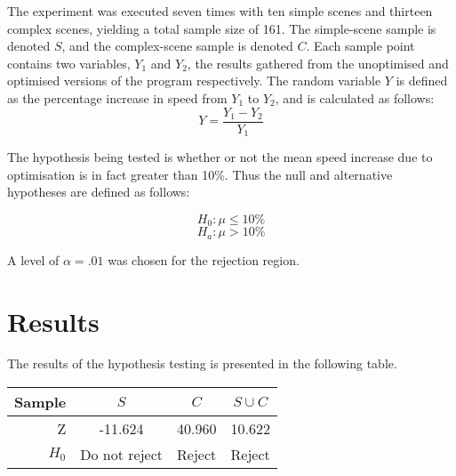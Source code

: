 \documentclass[a4paper]{article}
\begin{document}
The experiment was executed seven times with ten simple scenes and thirteen complex scenes, yielding a total sample size of 161. The simple-scene sample is denoted $S$, and the complex-scene sample is denoted $C$. Each sample point contains two variables, $Y_1$ and $Y_2$, the results gathered from the unoptimised and optimised versions of the program respectively. The random variable $Y$ is defined as the percentage increase in speed from $Y_1$ to $Y_2$, and is calculated as follows:
$$
Y = \frac{Y_1 - Y_2}{Y_1}
$$

\begin{center}
\end{center}

The hypothesis being tested is whether or not the mean speed increase due to optimisation is in fact greater than 10\%. Thus the null and alternative hypotheses are defined as follows:

$$ H_0: \mu \leq 10\% $$
$$ H_a: \mu > 10\% $$

A level of $\alpha = .01$ was chosen for the rejection region.

\section{Results}

The results of the hypothesis testing is presented in the following table.

\begin{center}
  \begin{tabular}{ | r || c | c | c | }
    \hline
    Sample  & $S$           & $C$    & $S \cup C$ \\ \hline \hline
    Z       & -11.624       & 40.960 & 10.622     \\ \hline
    $H_0$   & Do not reject & Reject & Reject     \\
    \hline
  \end{tabular}
\end{center}
\end{document}
